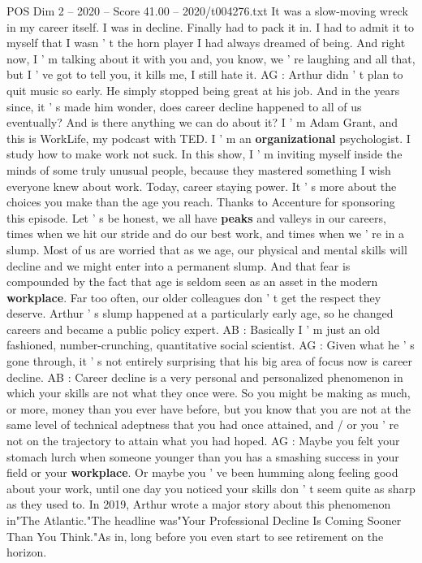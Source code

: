\begin{textsample}{POS Dim 2 – 2020 – Score 41.00 – 2020/t004276.txt}
It was a slow-moving wreck in my career itself.
I was in decline.
Finally had to pack it in.
I had to admit it to myself that I wasn ' t the horn player I had always dreamed of being.
And right now, I ' m talking about it with you and, you know, we ' re laughing and all that, but I ' ve got to tell you, it kills me, I still hate it.
AG : Arthur didn ' t plan to quit music so early.
He simply stopped being great at his job.
And in the years since, it ' s made him wonder, does career decline happened to all of us eventually?
And is there anything we can do about it?
I ' m Adam Grant, and this is WorkLife, my podcast with TED.
I ' m an \textbf{organizational} psychologist.
I study how to make work not suck.
In this show, I ' m inviting myself inside the minds of some truly unusual people, because they mastered something I wish everyone knew about work.
Today, career staying power.
It ' s more about the choices you make than the age you reach.
Thanks to Accenture for sponsoring this episode.
Let ' s be honest, we all have \textbf{peaks} and valleys in our careers, times when we hit our stride and do our best work, and times when we ' re in a slump.
Most of us are worried that as we age, our physical and mental skills will decline and we might enter into a permanent slump.
And that fear is compounded by the fact that age is seldom seen as an asset in the modern \textbf{workplace}.
Far too often, our older colleagues don ' t get the respect they deserve.
Arthur ' s slump happened at a particularly early age, so he changed careers and became a public policy expert.
AB : Basically I ' m just an old fashioned, number-crunching, quantitative social scientist.
AG : Given what he ' s gone through, it ' s not entirely surprising that his big area of focus now is career decline.
AB : Career decline is a very personal and personalized phenomenon in which your skills are not what they once were.
So you might be making as much, or more, money than you ever have before, but you know that you are not at the same level of technical adeptness that you had once attained, and / or you ' re not on the trajectory to attain what you had hoped.
AG : Maybe you felt your stomach lurch when someone younger than you has a smashing success in your field or your \textbf{workplace}.
Or maybe you ' ve been humming along feeling good about your work, until one day you noticed your skills don ' t seem quite as sharp as they used to.
In 2019, Arthur wrote a major story about this phenomenon in"The Atlantic."The headline was"Your Professional Decline Is Coming Sooner Than You Think."As in, long before you even start to see retirement on the horizon.

\end{textsample}
